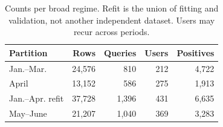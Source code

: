 \begin{table}[t]
\renewcommand{\arraystretch}{1.10}
\caption{Counts per broad regime. Refit is the union of fitting and validation, not another independent dataset. Users may recur across periods.}\label{tab:census}
\centering\small
\begin{tabular*}{\linewidth}{@{\extracolsep{\fill}}lrrrr@{}}\toprule
Partition & Rows & Queries & Users & Positives\\\midrule
Jan.--Mar. & 24,576 & 810 & 212 & 4,722\\
April & 13,152 & 586 & 275 & 1,913\\
Jan.--Apr. refit & 37,728 & 1,396 & 431 & 6,635\\
May--June & 21,207 & 1,040 & 369 & 3,283\\\bottomrule
\end{tabular*}
\end{table}
